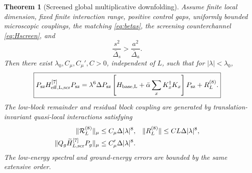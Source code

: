\documentclass[11pt]{article}
\newtheorem{theorem}{Theorem}[section]
\theoremstyle{definition}
\theoremstyle{remark}
\newcommand{\abs}[1]{\lvert #1\rvert}
\newcommand{\norm}[1]{\lVert #1\rVert}
\begin{document}
\begin{theorem}[Screened global multiplicative downfolding]
\label{thm:global-screened}
Assume finite local dimension, fixed finite interaction range, positive control gaps, uniformly bounded microscopic couplings, the matching \eqref{eq:betas}, the screening counterchannel \eqref{eq:Hscreen}, and
\begin{equation}
 \frac{s^2}{\bar\Delta_s}>\frac{a^2}{\bar\Delta_a}.
 \label{eq:positive-condition}
\end{equation}
Then there exist $\lambda_0,C_\mu,C_\mu',C>0$, independent of $L$, such that for $\abs\lambda<\lambda_0$,
\begin{equation}
\boxed{
P_{\rm sz}H_{\rm eff,L,{\rm scr}}^{[7]}P_{\rm sz}
=\lambda^6\Delta P_{\rm sz}\left[H_{\rm base,L}+\bar\alpha\sum_xK_x^\dagger K_x\right]P_{\rm sz}+R_L^{(8)}.
}
\label{eq:global-screened-theorem}
\end{equation}
The low-block remainder and residual block coupling are generated by translation-invariant quasi-local interactions satisfying
\begin{align}
 \norm{\mathcal R_L^{(8)}}_\mu&\le C_\mu\Delta\abs\lambda^8,
 &\norm{R_L^{(8)}}&\le CL\Delta\abs\lambda^8,
 \label{eq:remainder-screened}\\
 \norm{Q_g\widetilde H_{L,{\rm scr}}^{[7]}P_g}_\mu&\le C_\mu'\Delta\abs\lambda^8.
 \label{eq:offdiag-screened}
\end{align}
The low-energy spectral and ground-energy errors are bounded by the same extensive order.
\end{theorem}
\end{document}

